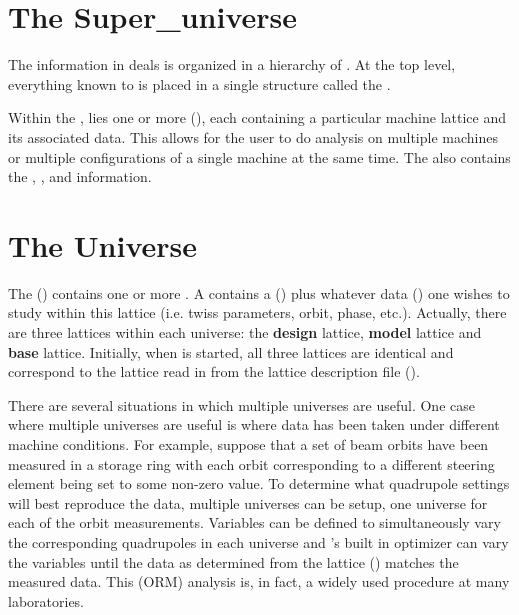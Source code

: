 \section{The Super\_universe}
\label{s:super.uni}

The information in \tao deals is organized in a hierarchy of . At the top level,
everything known to \tao is placed in a single structure called the .

Within the , lies one or more  (), each
 containing a particular machine lattice and its associated data. This allows for the
user to do analysis on multiple machines or multiple configurations of a single machine at the same
time. The  also contains the , , and  information.

\section{The Universe}
\label{s:universe}

The \tao {} () contains one or more .  A
 contains a  () plus whatever data () one
wishes to study within this lattice (i.e. twiss parameters, orbit, phase, etc.). Actually, there are
three lattices within each universe: the \textbf{design} lattice, \textbf{model} lattice and
\textbf{base} lattice. Initially, when \tao is started, all three lattices are identical and
correspond to the lattice read in from the lattice description file ().

There are several situations in which multiple universes are useful. One case where multiple
universes are useful is where data has been taken under different machine conditions. For example,
suppose that a set of beam orbits have been measured in a storage ring with each orbit corresponding
to a different steering element being set to some non-zero value. To determine what quadrupole
settings will best reproduce the data, multiple universes can be setup, one universe for each of the
orbit measurements. Variables can be defined to simultaneously vary the corresponding quadrupoles in
each universe and \tao's built in optimizer can vary the variables until the data as determined from
the  lattice () matches the measured data. This 
(ORM) analysis is, in fact, a widely used procedure at many laboratories.

